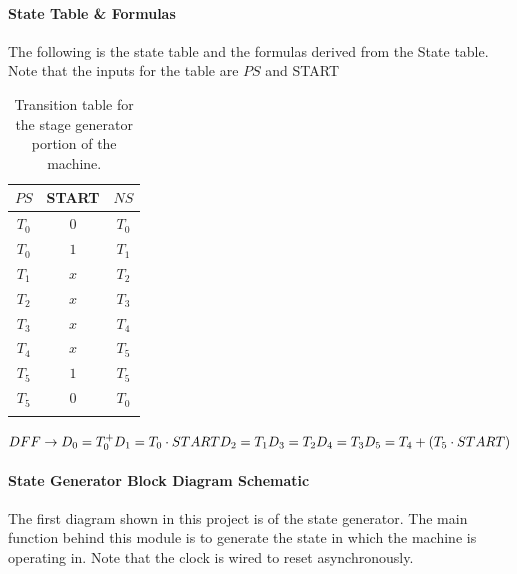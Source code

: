 \documentclass[11pt,a4paper,english]{article}
\begin{document}
  \paragraph*{State Table \& Formulas}
  The following is the state table and the formulas derived from the State table. Note that the inputs for the table are $PS$ and START %
  \begin{table}[H]
    \centering
    \caption{Transition table for the stage generator portion of the machine.}
    \begin{tabular}{c|c|c}%
      \toprule%
          $PS$    &  START &     $NS$      \\
      \midrule%
          $T_0$   &   $0$    &     $T_0$     \\\hdashline%
          $T_0$   &   $1$    &     $T_1$     \\\hdashline%
          $T_1$   &   $x$    &     $T_2$     \\\hdashline%
          $T_2$   &   $x$    &     $T_3$     \\\hdashline%
          $T_3$   &   $x$    &     $T_4$     \\\hdashline%
          $T_4$   &   $x$    &     $T_5$     \\\hdashline%
          $T_5$   &   $1$    &     $T_5$     \\\hdashline%
          $T_5$   &   $0$    &     $T_0$     \\\hdashline%
    \end{tabular}
  \end{table}

  \begin{math}
    DFF \rightarrow D_0 = T_0^+ \\ 
    D_1 = T_0 \cdot START \\
    D_2 = T_1 \\
    D_3 = T_2 \\ 
    D_4 = T_3 \\
    D_5 = T_4 + (T_5 \cdot START)
  \end{math}

\pagebreak

  \paragraph*{State Generator Block Diagram Schematic}
   The first diagram shown in this project is of the state generator. The main function behind this module is to generate the state in which the machine is operating in. Note that the clock is wired to reset asynchronously.
\end{document}
